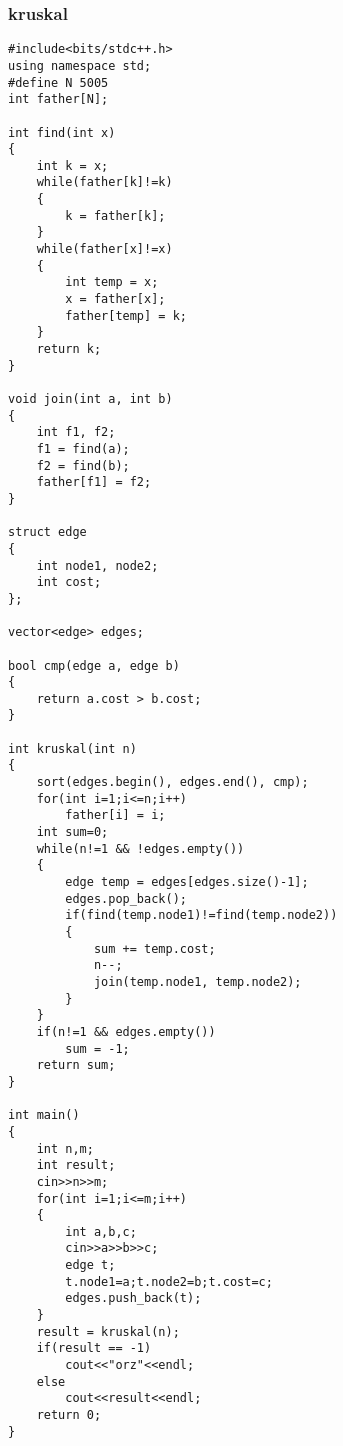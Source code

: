 \subsubsection{kruskal}
\begin{lstlisting}
#include<bits/stdc++.h>
using namespace std;
#define N 5005
int father[N];

int find(int x)
{
	int k = x;
	while(father[k]!=k)
	{
		k = father[k];
	}
	while(father[x]!=x)
	{
		int temp = x;
		x = father[x];
		father[temp] = k;
	}
	return k;
}

void join(int a, int b)
{
	int f1, f2;
	f1 = find(a);
	f2 = find(b);
	father[f1] = f2;
}

struct edge
{
	int node1, node2;
	int cost;
};

vector<edge> edges;

bool cmp(edge a, edge b)
{
	return a.cost > b.cost;
}

int kruskal(int n)
{
	sort(edges.begin(), edges.end(), cmp);
	for(int i=1;i<=n;i++)
		father[i] = i;
	int sum=0;
	while(n!=1 && !edges.empty())
	{
		edge temp = edges[edges.size()-1];
		edges.pop_back();
		if(find(temp.node1)!=find(temp.node2))
		{
			sum += temp.cost;
			n--;
			join(temp.node1, temp.node2);
		}
	}
	if(n!=1 && edges.empty())
		sum = -1;
	return sum;
}

int main()
{
	int n,m;
	int result;
	cin>>n>>m;
	for(int i=1;i<=m;i++)
	{
		int a,b,c;
		cin>>a>>b>>c;
		edge t;
		t.node1=a;t.node2=b;t.cost=c;
		edges.push_back(t);
	}
	result = kruskal(n);
	if(result == -1)
		cout<<"orz"<<endl;
	else
		cout<<result<<endl;
	return 0;
}
\end{lstlisting}

